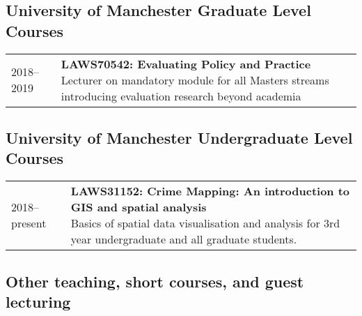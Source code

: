 \documentclass[10pt,a4paper,]{article}
\makeatletter
\def\briefitem#1#2#3{
#2 & \parbox[t]{0.85\textwidth}{%
      \textbf{#1}\\[-0.1cm]{\footnotesize #3}}\\[0.4cm]}
\def\briefsection#1{\begin{longtable}{@{\extracolsep{\fill}}ll}#1\end{longtable}}
\makeatother
\begin{document}
\hypertarget{university-of-manchester-graduate-level-courses}{%
\subsection{University of Manchester Graduate Level Courses}\label{university-of-manchester-graduate-level-courses}}

\briefsection{\briefitem{LAWS70542: Evaluating Policy and Practice}{2018–2019}{Lecturer on mandatory module for all Masters streams introducing evaluation research beyond academia}\briefitem{LAWS70311: Designing Criminological Research}{2016–present}{Course director and primary lecturer on compulsory research methods module for all Masters streams}\briefitem{LAWS70821: Data Analysis with R \& R Studio}{2016–2019}{2016: Course director and sole lecturer, 2018 onwards: ad-hoc lecturer on introductory statistics for MRes students using R}}

\hypertarget{university-of-manchester-undergraduate-level-courses}{%
\subsection{University of Manchester Undergraduate Level Courses}\label{university-of-manchester-undergraduate-level-courses}}

\briefsection{\briefitem{LAWS31152: Crime Mapping: An introduction to GIS and spatial analysis}{2018–present}{Basics of spatial data visualisation and analysis for 3rd year undergraduate and all graduate students.}\briefitem{LAWS20452 : Modelling Criminological Data}{2017–present}{Inferential statistics course for 2nd year undergraduates.}\briefitem{LAWS30620: Short Dissertation}{2017–present}{Lectures and supervision of students on secondary data analysis pathway for their final year dissertation.}\briefitem{LAWS20441: Making Sense of Criminological Data}{2016–present}{Introduction to quantitative research for 2nd year undergraduates.}}

\hypertarget{other-teaching-short-courses-and-guest-lecturing}{%
\subsection{Other teaching, short courses, and guest lecturing}\label{other-teaching-short-courses-and-guest-lecturing}}
\end{document}
